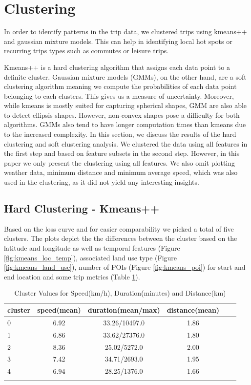 \section{Clustering}
\label{sec:clustering}

In order to identify patterns in the trip data, we clustered trips using kmeans++ and gaussian mixture models. This can help in identifying local hot spots or recurring trips types such as commutes or leisure trips.

Kmeans++ is a hard clustering algorithm that assigns each data point to a definite cluster. Gaussian mixture models (GMMs), on the other  hand, are a soft clustering algorithm meaning we compute the probabilities of each data point belonging to each clusters. This gives us a measure of uncertainty. Moreover, while kmeans is mostly suited for capturing spherical shapes, GMM are also able to detect ellipsis shapes. However, non-convex shapes pose a difficulty for both algorithms. GMMs also tend to have longer computation times than kmeans due to the increased complexity.
In this section, we discuss the results of the hard clustering and soft clustering analysis. We clustered the data using all features in the first step and based on feature subsets in the second step. However, in this paper we only present the clustering using all features. We also omit plotting weather data, minimum distance and minimum average speed, which was also used in the clustering, as it did not yield any interesting insights.

\subsection{Hard Clustering - Kmeans++}
\label{sec:hard_clustering}

Based on the loss curve and for easier comparability we picked a total of five clusters. The plots depict the the differences between the cluster based on the latitude and longitude as well as temporal features (Figure \ref{fig:kmeans_loc_temp}), associated land use type (Figure \ref{fig:kmeans_land_use}), number of POIs (Figure \ref{fig:kmeans_poi}) for start and end location and some trip metrics (Table \ref{table:kmeans_trip_metrics}). 

\begin{longtable}{|l|c|c|c|c|c|}
    \hline
    \textbf{cluster} & \textbf{speed(mean)}  & \textbf{duration(mean/max)}   & \textbf{distance(mean)} \\
    \hline
    0 & 6.92 & 33.26/10497.0 & 1.86 \\
    \hline
    1 & 6.86 & 33.62/27376.0 & 1.80 \\
    \hline
    2 & 8.36 & 25.02/5272.0 & 2.00 \\
    \hline
    3 & 7.42 & 34.71/2693.0 & 1.95 \\
    \hline
    4 & 6.94 & 28.25/1376.0 & 1.66\\
    \hline

  \caption{Cluster Values for Speed(km/h), Duration(minutes) and Distance(km)}
  \label{table:kmeans_trip_metrics}
\end{longtable}


